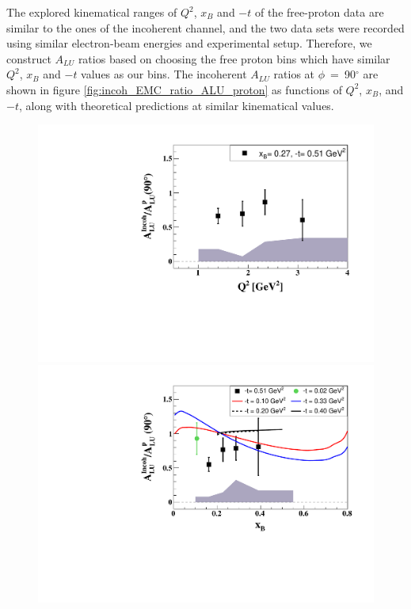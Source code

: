 The explored kinematical ranges of $Q^2$, $x_{B}$ and $-t$ of the free-proton 
data are similar to the ones of the incoherent channel, and the two data sets 
were recorded using similar electron-beam energies and experimental setup.  
Therefore, we construct $A_{LU}$ ratios based on choosing the free proton bins 
which have similar $Q^2$, $x_{B}$ and $-t$ values as our bins. The incoherent 
$A_{LU}$ ratios at $\phi$~=~90$^{\circ}$ are shown in figure 
\ref{fig:incoh_EMC_ratio_ALU_proton} as functions of $Q^{2}$, $x_{B}$, and 
$-t$, along with theoretical predictions at similar kinematical values.
  
\begin{figure}[tp]
\centering
\includegraphics[scale=0.46]{fig_Dec2016/ALU_ratioInc_Q2_shortscenrario.pdf}\\
\includegraphics[scale=0.46]{fig_Dec2016/ALU_ratioInc_x_shortscenrario.pdf}\\

\end{figure}

